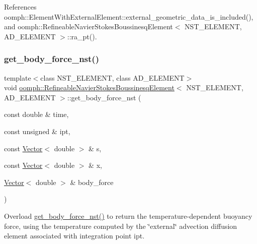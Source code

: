 References oomph\+::\+Element\+With\+External\+Element\+::external\+\_\+geometric\+\_\+data\+\_\+is\+\_\+included(), and oomph\+::\+Refineable\+Navier\+Stokes\+Boussinesq\+Element$<$ N\+S\+T\+\_\+\+E\+L\+E\+M\+E\+N\+T, A\+D\+\_\+\+E\+L\+E\+M\+E\+N\+T $>$\+::ra\+\_\+pt().

\mbox{\label{classoomph_1_1RefineableNavierStokesBoussinesqElement_a7c422f8666f9acef4d26f187a4dc4e28}} 
\subsubsection{\texorpdfstring{get\+\_\+body\+\_\+force\+\_\+nst()}{get\_body\_force\_nst()}}
{\footnotesize\ttfamily template$<$class N\+S\+T\+\_\+\+E\+L\+E\+M\+E\+NT, class A\+D\+\_\+\+E\+L\+E\+M\+E\+NT$>$ \\
void \hyperlink{classoomph_1_1RefineableNavierStokesBoussinesqElement}{oomph\+::\+Refineable\+Navier\+Stokes\+Boussinesq\+Element}$<$ N\+S\+T\+\_\+\+E\+L\+E\+M\+E\+NT, A\+D\+\_\+\+E\+L\+E\+M\+E\+NT $>$\+::get\+\_\+body\+\_\+force\+\_\+nst (\begin{DoxyParamCaption}\item[{const double \&}]{time,  }\item[{const unsigned \&}]{ipt,  }\item[{const \hyperlink{classoomph_1_1Vector}{Vector}$<$ double $>$ \&}]{s,  }\item[{const \hyperlink{classoomph_1_1Vector}{Vector}$<$ double $>$ \&}]{x,  }\item[{\hyperlink{classoomph_1_1Vector}{Vector}$<$ double $>$ \&}]{body\+\_\+force }\end{DoxyParamCaption})\hspace{0.3cm}{\ttfamily [inline]}}



Overload \hyperlink{classoomph_1_1RefineableNavierStokesBoussinesqElement_a7c422f8666f9acef4d26f187a4dc4e28}{get\+\_\+body\+\_\+force\+\_\+nst()} to return the temperature-\/dependent buoyancy force, using the temperature computed by the \char`\"{}external\char`\"{} advection diffusion element associated with integration point {\ttfamily ipt}. 



